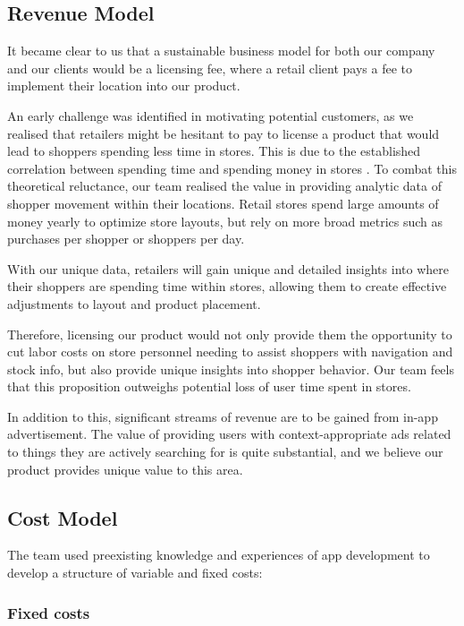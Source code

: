 \documentclass[titlepage]{article}
\begin{document}
\subsection{Revenue Model}

It became clear to us that a sustainable business model for both our company and our clients would be a licensing fee, where a retail client pays a fee to implement their location into our product. 

An early challenge was identified in motivating potential customers, as we realised that retailers might be hesitant to pay to license a product that would lead to shoppers spending less time in stores.
This is due to the established correlation between spending time and spending money in stores \cite{byron}. To combat this theoretical reluctance, our team realised the value in providing analytic data of shopper movement within their locations. Retail stores spend large amounts of money yearly to optimize store layouts, but rely on more broad metrics such as purchases per shopper or shoppers per day.

With our unique data, retailers will gain unique and detailed insights into where their shoppers are spending time within stores, allowing them to create effective adjustments to layout and product placement.

Therefore, licensing our product would not only provide them the opportunity to cut labor costs on store personnel needing to assist shoppers with navigation and stock info, but also provide unique insights into shopper behavior. Our team feels that this proposition outweighs potential loss of user time spent in stores.

In addition to this, significant streams of revenue are to be gained from in-app advertisement. The value of providing users with context-appropriate ads related to things they are actively searching for is quite substantial, and we believe our product provides unique value to this area.

\subsection{Cost Model}

The team used preexisting knowledge and experiences of app development to develop a structure of variable and fixed costs:

\subsubsection{Fixed costs}
\end{document}
